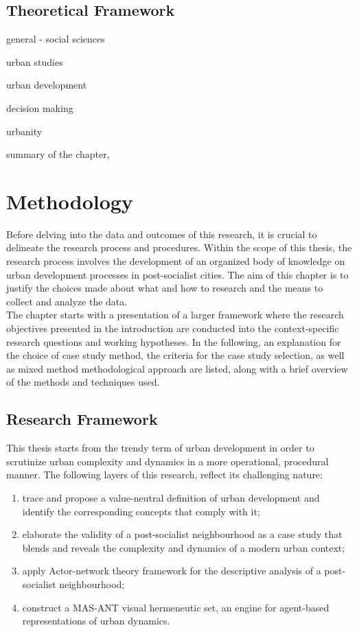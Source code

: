 \documentclass[11pt]{report}
\begin{document}
\section{Theoretical Framework}

general - social sciences

urban studies

urban development

decision making

urbanity

summary of the chapter,


\chapter{Methodology}

Before delving into the data  and outcomes of this research, it is crucial to delineate the research process and procedures. Within the scope of this thesis, the research process involves the development of an organized body of knowledge on urban development processes in post-socialist cities. The aim of this chapter is to justify the choices made about what and how to research and the means to collect and analyze the data.
\\
The chapter starts with a presentation of a larger framework where the research objectives presented in the introduction are conducted into the context-specific research questions and working hypotheses. In the following, an explanation for the choice of case study method, the criteria for the case study selection, as well as mixed method methodological approach are listed, along with a brief overview of the methods and techniques used.  

\section{Research Framework}

This thesis starts from the trendy term of urban development in order to scrutinize urban complexity and dynamics in a more operational, procedural manner. The following layers of this research, reflect its challenging nature:

\begin{enumerate}
\item trace and propose a value-neutral definition of urban development and identify the corresponding concepts that comply with it;
\item elaborate the validity of a post-socialist neighbourhood as a case study that blends and reveals the complexity and dynamics of a modern urban context;
\item apply Actor-network theory framework for the descriptive analysis of a post-socialist neighbourhood;
\item construct a MAS-ANT visual hermeneutic set, an engine for agent-based representations of urban dynamics.    
\end{enumerate}
\end{document}
